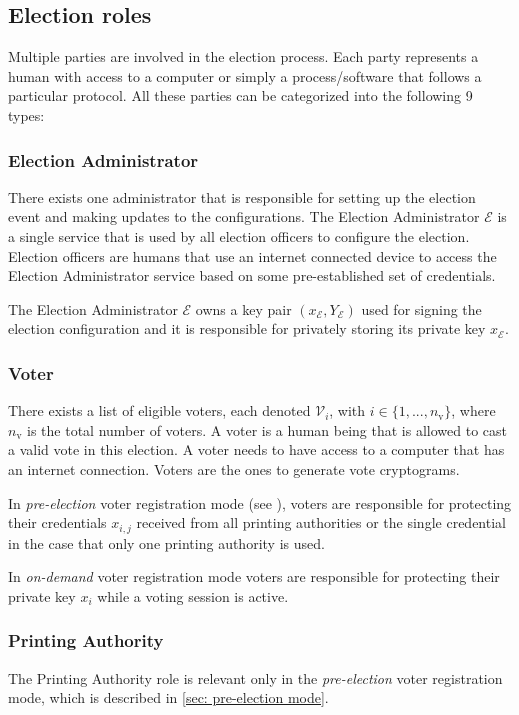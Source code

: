 \subsection{Election roles} \label{sec: election roles}
Multiple parties are involved in the election process. Each party represents a human with access to a computer or simply a process/software that follows a particular protocol. All these parties can be categorized into the following 9 types: 


\subsubsection{Election Administrator}
There exists one administrator that is responsible for setting up the election event and making updates to the configurations. The Election Administrator $\mathcal{E}$ is a single service that is used by all election officers to configure the election. Election officers are humans that use an internet connected device to access the Election Administrator service based on some pre-established set of credentials.

The Election Administrator $\mathcal{E}$ owns a key pair $(x_\mathcal{E}, Y_\mathcal{E})$ used for signing the election configuration and it is responsible for privately storing its private key $x_\mathcal{E}$.


\subsubsection{Voter}
There exists a list of eligible voters, each denoted $\mathcal{V}_i$, with \( i \in \{ 1, ..., n_\mathrm{v} \} \), where $n_\mathrm{v}$ is the total number of voters.  A voter is a human being that is allowed to cast a valid vote in this election. A voter needs to have access to a computer that has an internet connection. Voters are the ones to generate vote cryptograms.

In \textit{pre-election} voter registration mode (see ), voters are responsible for protecting their credentials $x_{i,j}$ received from all printing authorities or the single credential in the case that only one printing authority is used.

In \textit{on-demand} voter registration mode voters are responsible for protecting their private key $x_i$ while a voting session is active.


\subsubsection{Printing Authority}
The Printing Authority role is relevant only in the \textit{pre-election} voter registration mode, which is described in \cref{sec: pre-election mode}.
    
